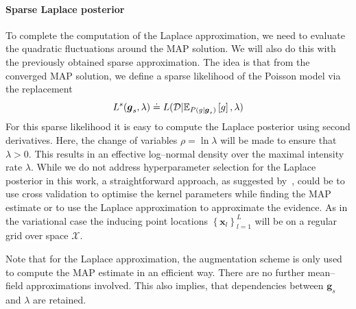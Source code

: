 \documentclass[twoside,11pt]{article}
\newcommand{\dataset}{{\cal D}}
\newcommand{\EE}[2]{\mathbb{E}_{#1}\left[ #2 \right]}
\newcommand{\set}[1]{\left\lbrace #1 \right\rbrace}
\newcommand{\bx}{\boldsymbol{x}}
\newcommand{\bg}{\boldsymbol{g}}
\newcommand{\calS}{\mathcal{S}}
\newcommand{\X}{\mathcal{X}}
\begin{document}

\paragraph{Sparse Laplace posterior} To complete the computation of the Laplace approximation, we need
to evaluate the quadratic fluctuations around the MAP solution. We will also do this with the previously obtained sparse approximation.
The idea is that from the converged MAP solution, we define a sparse likelihood of the Poisson
model via the replacement
\begin{equation}
L^s(\bg_s,\lambda) \doteq L(\dataset\vert \EE{P(g\vert \bg_s)}{g}, \lambda)
\end{equation}
For this sparse likelihood it is easy to compute the Laplace posterior using second derivatives. Here,
the change of variables $\rho=\ln \lambda$ will be made to ensure that $\lambda>0$. This results in an
effective log--normal density over the maximal intensity rate $\lambda$.
While we do not address hyperparameter selection for the Laplace posterior in this work, a straightforward approach, as suggested by~\citet{flaxman2017poisson}, could be to use cross validation to optimise the kernel parameters while finding the MAP estimate or to use the Laplace approximation to approximate the evidence. As in the variational case the inducing point locations $\set{\bx_l}_{l=1}^L$ will be on a regular grid over space $\X$.

Note that for the Laplace approximation, the augmentation scheme is only used to compute the MAP estimate in 
an efficient way. There are no further mean--field approximations involved. This also implies, that dependencies between $\bg_s$ and $\lambda$ are retained. 
\end{document}
